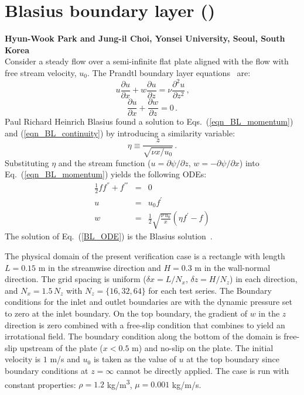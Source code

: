 \documentclass[11pt]{book}
\begin{document}
\section{Blasius boundary layer (\texorpdfstring{}{blasius})}

\textbf{Hyun-Wook Park and Jung-il Choi, Yonsei University, Seoul, South Korea}\\

\noindent Consider a steady flow over a semi-infinite flat plate aligned with the flow with free stream velocity, $u_0$. The Prandtl boundary layer equations~\cite{Panton:1} are:
\begin{equation}
\label{eqn_BL_momentum}
u \frac{\partial u}{\partial x} + w \frac{\partial u}{\partial z} = \nu \frac{\partial^2 u}{\partial z^2} \,\mbox{,}
\end{equation}
\begin{equation}
\label{eqn_BL_continuity}
\frac{\partial u}{\partial x}+\frac{\partial w}{\partial z} = 0 \,\mbox{.}
\end{equation}
Paul Richard Heinrich Blasius found a solution to Eqs.~(\ref{eqn_BL_momentum}) and (\ref{eqn_BL_continuity}) by introducing a similarity variable:
\begin{equation}
\label{eta}
\eta\equiv\frac{z}{\sqrt{\nu x/u_0}} \,\mbox{.}
\end{equation}
Substituting $\eta$ and the stream function ($u = \partial \psi/\partial z$, $w = -\partial \psi/\partial x$) into Eq.~(\ref{eqn_BL_momentum}) yields the following ODEs:
\begin{eqnarray}
\label{BL_ODE}
\frac{1}{2}f f^{''}+f^{'''}&=&0 \\
u&=&u_0 f^{'} \\
w&=&\frac{1}{2}\sqrt{\frac{\nu \,u_0}{x}}(\eta f^{'}-f)
\end{eqnarray}
The solution of Eq.~(\ref{BL_ODE}) is the Blasius solution~\cite{Panton:1}.

The physical domain of the present verification case is a rectangle with length $L=0.15$ m in the streamwise direction and $H=0.3$ m in the wall-normal direction. The grid spacing is uniform ($\delta x = L/N_x$, $\delta z =H/N_z$) in each direction, and $N_x = 1.5 \, N_z$ with $N_z = \{16, 32, 64\}$ for each test series. The Boundary conditions for the inlet and outlet boundaries are  with the dynamic pressure set to zero at the inlet boundary. On the top boundary, the gradient of $w$ in the $z$ direction is zero combined with a free-slip condition that combines to yield an irrotational field. The boundary condition along the bottom of the domain is free-slip upstream of the plate ($x<0.5$ m) and no-slip on the plate. The initial velocity is $1$ m/s and $u_0$ is taken as the value of $u$ at the top boundary since boundary conditions at $z=\infty$ cannot be directly applied. The case is run with constant properties: $\rho=1.2$ \si{kg/m^3}, $\mu = 0.001$ kg/m/s.
\end{document}
